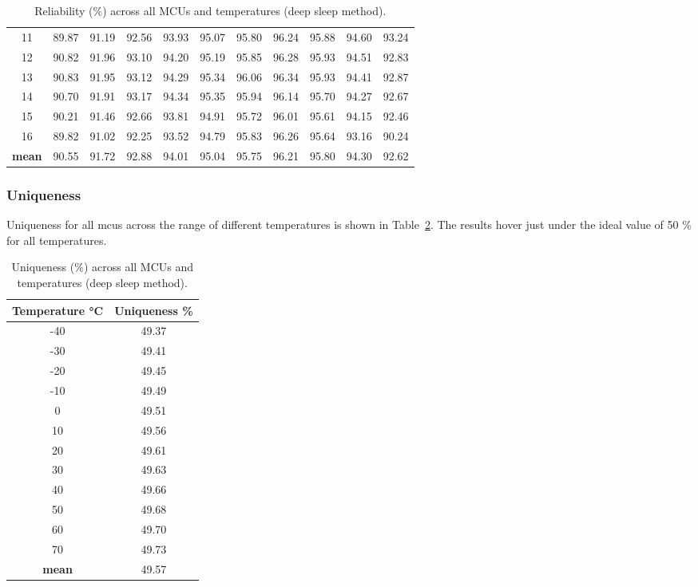 \begin{table}[ht!]
\begin{tabular}{c||rrrrrrrrrr}
    11   &  89.87 &  91.19 &  92.56 &  93.93 & 95.07 & 95.80 & 96.24 & 95.88 & 94.60 & 93.24 \\
    12   &  90.82 &  91.96 &  93.10 &  94.20 & 95.19 & 95.85 & 96.28 & 95.93 & 94.51 & 92.83 \\
    13   &  90.83 &  91.95 &  93.12 &  94.29 & 95.34 & 96.06 & 96.34 & 95.93 & 94.41 & 92.87 \\
    14   &  90.70 &  91.91 &  93.17 &  94.34 & 95.35 & 95.94 & 96.14 & 95.70 & 94.27 & 92.67 \\
    15   &  90.21 &  91.46 &  92.66 &  93.81 & 94.91 & 95.72 & 96.01 & 95.61 & 94.15 & 92.46 \\
    16   &  89.82 &  91.02 &  92.25 &  93.52 & 94.79 & 95.83 & 96.26 & 95.64 & 93.16 & 90.24 \\
    \textbf{mean} &  90.55 &  91.72 &  92.88 &  94.01 & 95.04 & 95.75 & 96.21 & 95.80 & 94.30 & 92.62 \\
    \bottomrule
    \end{tabular}
    \captionsetup{justification=centering,margin=0.5cm}
    \caption{Reliability (\%) across all MCUs and temperatures (deep sleep method).}
    \label{table:reliability_deep_sleep}
\end{table}

\subsubsection*{Uniqueness}

Uniqueness for all \glspl{mcu} across the range of different temperatures is shown in Table~\ref{table:uniqueness_deep_sleep}. The results hover just under the ideal value of 50 \% for all temperatures.

\begin{table}[ht!]
    \centering
    \begin{tabular}{cc}
        \textbf{Temperature °C} & \textbf{Uniqueness \%} \\
    \toprule
    -40  & 49.37 \\
    -30  & 49.41 \\
    -20  & 49.45 \\
    -10  & 49.49 \\
    0    & 49.51 \\
    10   & 49.56 \\
    20   & 49.61 \\
    30   & 49.63 \\
    40   & 49.66 \\
    50   & 49.68 \\
    60   & 49.70 \\
    70   & 49.73 \\
    \textbf{mean} & 49.57 \\
    \bottomrule
    \end{tabular}
    \captionsetup{justification=centering,margin=0.5cm}
    \caption{Uniqueness (\%) across all MCUs and temperatures (deep sleep method).}
    \label{table:uniqueness_deep_sleep}
\end{table}


